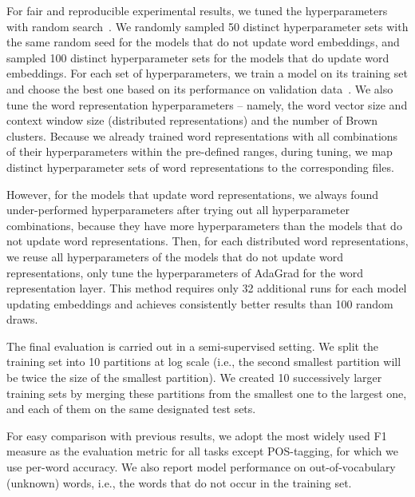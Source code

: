 For fair and reproducible experimental results, we tuned the hyperparameters with random search~\cite{bergstra2012random}. 
We randomly sampled 50 distinct hyperparameter sets with the same random seed for the models that do not update word embeddings, and sampled 100 distinct hyperparameter sets for the models that do update word embeddings. 
For each set of hyperparameters, we train a model on its training set and choose the best one based on its performance on validation data~\cite{turian2010word}. 
We also tune the word representation hyperparameters -- namely, the word vector size and context window size (distributed representations) and the number of Brown clusters. Because we already trained word representations with all combinations of their hyperparameters within the pre-defined ranges, during tuning, we map distinct hyperparameter sets of word representations to the corresponding files. 

However, for the models that update word representations, we always found under-performed hyperparameters after trying out all hyperparameter combinations, because they have more hyperparameters than the models that do not update word representations. Then, for each distributed word representations, we reuse all hyperparameters of the models that do not update word representations, only tune the hyperparameters of AdaGrad for the word representation layer. This method requires only 32 additional runs for each model updating embeddings and achieves consistently better results than 100 random draws.

The final evaluation is carried out in a semi-supervised setting. We split the training set into 10 partitions at log scale (i.e., the second smallest partition will be twice the size of the smallest partition). We created 10 successively larger training sets by merging these partitions from the smallest one to the largest one, and  each of them on the same designated test sets. 

For easy comparison with previous results, we adopt the most widely used F1 measure as the evaluation metric for all tasks except POS-tagging, for which we use per-word accuracy. We also report model performance on out-of-vocabulary (unknown) words, i.e., the words that do not occur in the training set.


